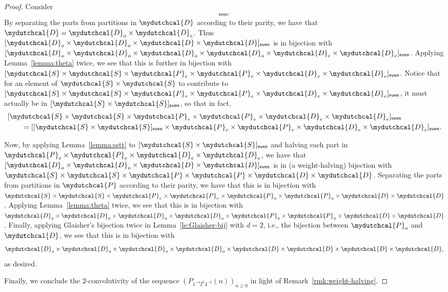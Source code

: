 \documentclass[12pt,reqno]{amsart}
\numberwithin{equation}{section}
\theoremstyle{plain}
\theoremstyle{definition}
\theoremstyle{named}
\newcommand{\cP}{\mydutchcal{P}}
\newcommand{\cD}{\mydutchcal{D}}
\newcommand{\cS}{\mydutchcal{S}}
\newcommand{\even}{\mathsf{even}}
\begin{document}
\begin{proof}
	Consider 
	\begin{align*}
		[\cD_{o} \times \cD_{o} \times \cD \times \cD]_\even.
	\end{align*}
	By separating the parts from partitions in $\cD$ according to their parity, we have that $\cD = \cD_o \times \cD_e$. Thus $[\cD_{o} \times \cD_{o} \times \cD \times \cD]_\even$ is in bijection with $[\cD_{o} \times \cD_{o} \times \cD_o \times \cD_o \times \cD_e \times \cD_e]_\even$. Applying Lemma~\ref{lemma:theta} twice, we see that this is further in bijection with $[\cS \times \cS \times \cP_e \times \cP_e \times \cD_{e} \times \cD_{e}]_\even$.
	Notice that for an element of $\cS \times \cS$ to contribute to $[\cS \times \cS \times \cP_e \times \cP_e \times \cD_{e} \times \cD_{e}]_\even$, it must actually be in $[\cS \times \cS]_\even$, so that in fact,
	\begin{align*}
		&[\cS \times \cS \times \cP_e \times \cP_e \times \cD_{e} \times \cD_{e}]_\even\\
		&\qquad = [[\cS \times \cS]_\even \times \cP_e \times \cP_e \times \cD_{e} \times \cD_{e}]_\even.
	\end{align*}
	
	Now, by applying Lemma~\ref{lemma:sstt} to $[\cS \times \cS]_\even$ and halving each part in $\cP_e \times \cP_e \times \cD_{e} \times \cD_{e}$, we have that $[\cD_{o} \times \cD_{o} \times \cD \times \cD]_\even$ is in (a weight-halving) bijection with $\cS \times \cS \times \cP \times \cP \times \cD \times \cD$. Separating the parts from partitions in $\cP$ according to their parity, we have that this is in bijection with $\cS \times \cS \times \cP_e \times \cP_e \times \cP_o \times \cP_o \times \cD \times \cD$. Applying Lemma~\ref{lemma:theta} twice, we see that this is in bijection with $\cD_o \times \cD_o \times \cD_o \times \cD_o \times \cP_o \times \cP_o \times \cD \times \cD$. Finally, applying Glaisher's bijection twice in Lemma~\ref{le:Glaisher-bij} with $d=2$, i.e., the bijection between $\cP_o$ and $\cD$, we see that this is in bijection with
	\begin{align*}
		\cD_o \times \cD_o \times \cD_o \times \cD_o \times \cD \times \cD \times \cD \times \cD,
	\end{align*}
	as desired.
	
	Finally, we conclude the $2$-convolutivity of the sequence $(P_{1^{-4} 2^6 4^{-2}}(n))_{n\ge 0}$ in light of Remark~\ref{rmk:weight-halving}.
\end{proof}
\end{document}
